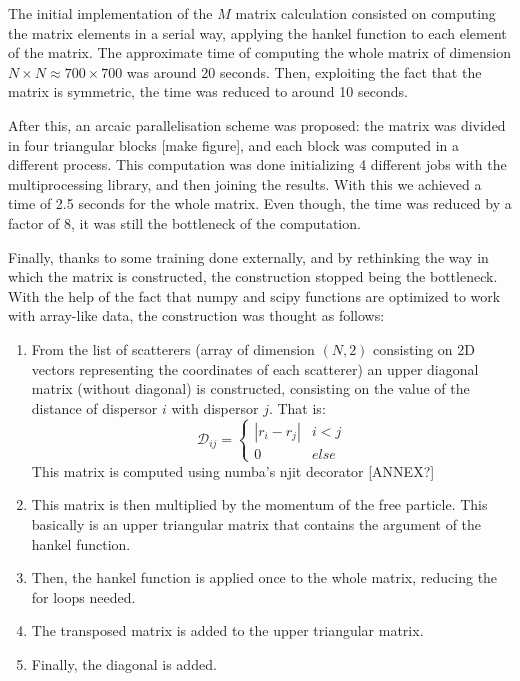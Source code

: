 The initial implementation of the $M$ matrix calculation consisted on computing the matrix elements in a serial way, applying the hankel function to each element of the matrix. The approximate time of computing the whole matrix of dimension $N\times N \approx 700\times 700$ was around 20 seconds. Then, exploiting the fact that the matrix is symmetric, the time was reduced to around 10 seconds.

After this, an arcaic parallelisation scheme was proposed: the matrix was divided in four triangular blocks [make figure], and each block was computed in a different process. This computation was done initializing 4 different jobs with the multiprocessing library, and then joining the results. With this we achieved a time of 2.5 seconds for the whole matrix. Even though, the time was reduced by a factor of 8, it was still the bottleneck of the computation.

Finally, thanks to some training done externally, and by rethinking the way in which the matrix is constructed, the construction stopped being the bottleneck. With the help of the fact that numpy and scipy functions are optimized to work with array-like data, the construction was thought as follows:

\begin{enumerate}
    \item From the list of scatterers (array of dimension $(N,2)$ consisting on 2D vectors representing the coordinates of each scatterer) an upper diagonal matrix (without diagonal) is constructed, consisting on the value of the distance of dispersor $i$ with dispersor $j$. That is:
    \begin{equation}
        \mathcal{D}_{ij}=\begin{cases}
            |r_i-r_j|& i<j\\
            0&else
        \end{cases}
    \end{equation}
    This matrix is computed using numba's njit decorator [ANNEX?]
    \item This matrix is then multiplied by the momentum of the free particle. This basically is an upper triangular matrix that contains the argument of the hankel function.
    \item Then, the hankel function is applied once to the whole matrix, reducing the for loops needed.
    \item The transposed matrix is added to the upper triangular matrix.
    \item Finally, the diagonal is added.
\end{enumerate}
